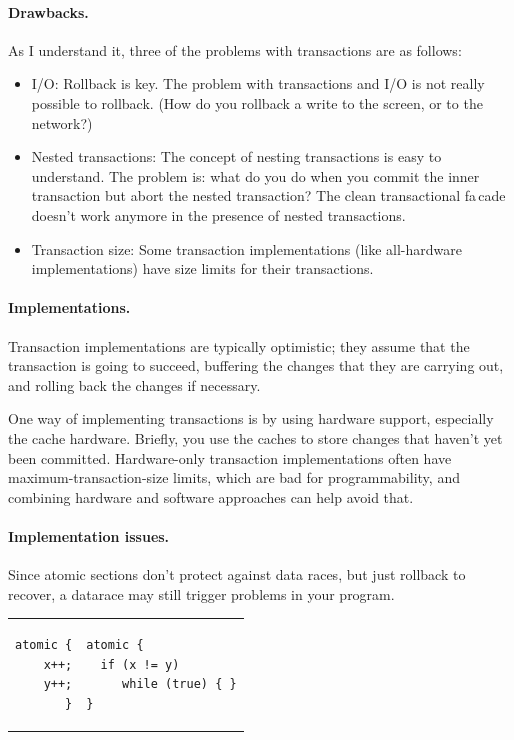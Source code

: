 \documentclass[a4paper]{report}
\begin{document}
\paragraph{Drawbacks.} As I understand it, three of the problems with 
transactions are as follows:

\begin{itemize}
\item I/O: Rollback is key. The problem with transactions and I/O is
  not really possible to rollback. (How do you rollback a write to the
  screen, or to the network?)

\item Nested transactions: The concept of nesting transactions is easy
  to understand. The problem is: what do you do when you commit the
  inner transaction but abort the nested transaction? The clean
  transactional fa\,cade doesn't work anymore in the presence of
  nested transactions.

\item Transaction size: Some transaction implementations (like
  all-hardware implementations) have size limits for their
  transactions.
\end{itemize}

\paragraph{Implementations.} Transaction implementations are typically 
optimistic; they assume that the transaction is going to succeed,
buffering the changes that they are carrying out, and rolling back the
changes if necessary.

One way of implementing transactions is by using hardware support,
especially the cache hardware. Briefly, you use the caches to store
changes that haven't yet been committed. Hardware-only transaction
implementations often have maximum-transaction-size limits, which are
bad for programmability, and combining hardware and software approaches
can help avoid that.

\paragraph{Implementation issues.} Since atomic sections don't protect
against data races, but just rollback to recover, a datarace may still
trigger problems in your program.

\begin{tabular}{r|l}
\hspace*{2em}  \begin{minipage}{.4\textwidth}
\begin{lstlisting}
atomic {
  x++;
  y++;
}
\end{lstlisting}
\end{minipage}
&
\hspace*{2em} \begin{minipage}{.4\textwidth}
\begin{lstlisting}
atomic {
  if (x != y)
     while (true) { }
}
\end{lstlisting}
\end{minipage}
\end{tabular}
\end{document}
